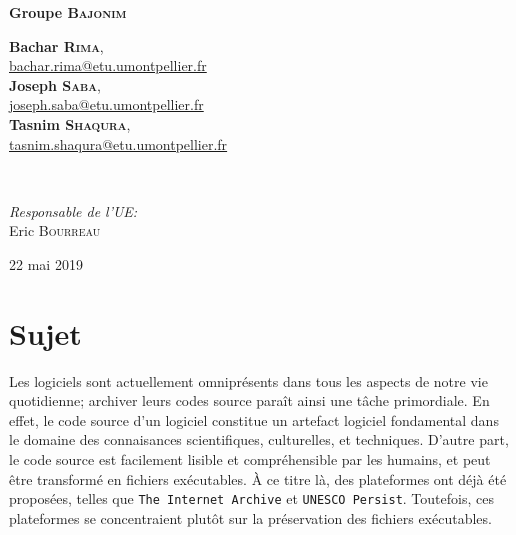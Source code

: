 \documentclass[12pt,a4paper]{report}
\begin{document}
\begin{titlepage}
{ \huge \bfseries Groupe \textsc{Bajonim}}\\[0.4cm]
\begin{minipage}{0.4\textwidth}
\centering \small
\textbf{Bachar \textsc{Rima}}, \\ \href{mailto:bachar.rima@etu.umontpellier.fr}{bachar.rima@etu.umontpellier.fr}\\ %
\textbf{Joseph \textsc{Saba}}, \\ \href{mailto:joseph.saba@etu.umontpellier.fr}{joseph.saba@etu.umontpellier.fr}\\ %
\textbf{Tasnim \textsc{Shaqura}}, \\ \href{mailto:tasnim.shaqura@etu.umontpellier.fr}{tasnim.shaqura@etu.umontpellier.fr}\\ %
\end{minipage} \\[0.8cm]

\begin{center}

\emph{Responsable de l'UE:} \\
Eric \textsc{Bourreau} %
\end{center}

{\large 22 mai 2019}\\[1cm]
\hspace{\fill}
\vfill %
\end{titlepage}

\tableofcontents

\chapter{Sujet}
Les logiciels sont actuellement omniprésents dans tous les aspects de notre vie quotidienne; archiver leurs codes source paraît ainsi une tâche primordiale. En effet, le code source d'un logiciel constitue un artefact logiciel fondamental dans le domaine des connaisances scientifiques, culturelles, et techniques. D'autre part, le code source est facilement lisible et compréhensible par les humains, et peut être transformé en fichiers exécutables. À ce titre là, des plateformes ont déjà été proposées, telles que \texttt{The Internet Archive} et \texttt{UNESCO Persist}. Toutefois, ces plateformes se concentraient plutôt sur la préservation des fichiers exécutables.
\end{document}
